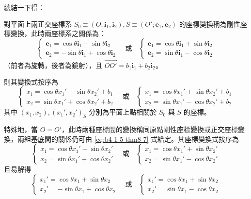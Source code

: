 總結一下得：

\begin{theorem}[定理 8]
對平面上兩正交座標系 $S_0 \equiv (O; \mathbf{i}_1, \mathbf{i}_2), S \equiv (O'; \mathbf{e}_1, \mathbf{e}_2)$ 的座標變換稱為剛性座標變換，此時兩座標系之關係為：
\begin{equation}
\begin{cases}
\mathbf{e}_1 = \cos\theta\mathbf{i}_1 + \sin\theta\mathbf{i}_2 \\
\mathbf{e}_2 = -\sin\theta\mathbf{i}_1 + \cos\theta\mathbf{i}_2
\end{cases} \quad \text{或} \quad
\begin{cases}
\mathbf{e}_1 = \cos\theta\mathbf{i}_1 + \sin\theta\mathbf{i}_2 \\
\mathbf{e}_2 = \sin\theta\mathbf{i}_1 - \cos\theta\mathbf{i}_2
\end{cases} \label{eq:b4-1-5-thm8-7}
\end{equation}
（前者為旋轉，後者為鏡射），且 $\vec{OO'} = b_1\mathbf{i}_1 + b_2\mathbf{i}_2$。

則其變換式按序為
\begin{equation}
\begin{cases}
x_1 = \cos\theta x_1' - \sin\theta x_2' + b_1 \\
x_2 = \sin\theta x_1' + \cos\theta x_2' + b_2
\end{cases} \quad \text{或} \quad
\begin{cases}
x_1 = \cos\theta x_1' + \sin\theta x_2' + b_1 \\
x_2 = \sin\theta x_1' - \cos\theta x_2' + b_2
\end{cases} \label{eq:b4-1-5-thm8-6}
\end{equation}
其中 $(x_1, x_2), (x_1', x_2')_S$ 分別為平面上點相關於 $S_0$ 與 $S$ 的座標。

特殊地，當 $O = O'$，此時兩種座標間的變換稱同原點剛性座標變換或正交座標變換，兩組基底間的關係仍可由 \eqref{eq:b4-1-5-thm8-7} 式給定。其座標變換式按序為
\[ \begin{cases} x_1 = \cos\theta x_1' - \sin\theta x_2' \\ x_2 = \sin\theta x_1' + \cos\theta x_2' \end{cases} \quad \text{或} \quad \begin{cases} x_1 = \cos\theta x_1' + \sin\theta x_2' \\ x_2 = \sin\theta x_1' - \cos\theta x_2' \end{cases} \]
且易解得
\[ \begin{cases} x_1' = \cos\theta x_1 + \sin\theta x_2 \\ x_2' = -\sin\theta x_1 + \cos\theta x_2 \end{cases} \quad \text{或} \quad \begin{cases} x_1' = \cos\theta x_1 + \sin\theta x_2 \\ x_2' = \sin\theta x_1 - \cos\theta x_2 \end{cases} \]
\end{theorem}

